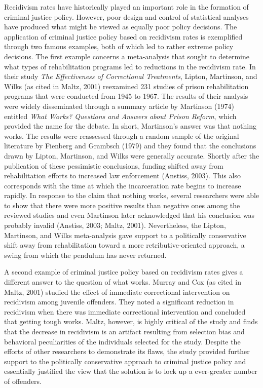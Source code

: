 Recidivism rates have historically played an important role in the formation of criminal justice policy.  However, poor design and control of statistical analyses have produced what might be viewed as equally poor policy decisions.  The application of criminal justice policy based on recidivism rates is exemplified through two famous examples, both of which led to rather extreme policy decisions.  The first example concerns a meta-analysis that sought to determine what types of rehabilitation programs led to reductions in the recidivism rate.  In their study \emph{The Effectiveness of Correctional Treatments}, Lipton, Martinson, and Wilks (as cited in Maltz, 2001) reexamined 231 studies of prison rehabilitation programs that were conducted from 1945 to 1967.  The results of their analysis were widely disseminated through a summary article by Martinson (1974) entitled \emph{What Works? Questions and Answers about Prison Reform}, which provided the name for the debate.  In short, Martinson's answer was that nothing works.  The results were reassessed through a random sample of the original literature by Fienberg and Grambsch (1979) and they found that the conclusions drawn by Lipton, Martinson, and Wilks were generally accurate.  Shortly after the publication of these pessimistic conclusions, funding shifted away from rehabilitation efforts to increased law enforcement (Anstiss, 2003).  This also corresponds with the time at which the incarceration rate begins to increase rapidly. In response to the claim that nothing works, several researchers were able to show that there were more positive results than negative ones among the reviewed studies and even Martinson later acknowledged that his conclusion was probably invalid (Anstiss, 2003; Maltz, 2001).  Nevertheless, the Lipton, Martinson, and Wilks meta-analysis gave support to a politically conservative shift away from rehabilitation toward a more retributive-oriented approach, a swing from which the pendulum has never returned.

A second example of criminal justice policy based on recidivism rates gives a different answer to the question of what works.  Murray and Cox (as cited in Maltz, 2001) studied the effect of immediate correctional intervention on recidivism among juvenile offenders.  They noted a significant reduction in recidivism when there was immediate correctional intervention and concluded that getting tough works.  Maltz, however, is highly critical of the study and finds that the decrease in recidivism is an artifact resulting from selection bias and behavioral peculiarities of the individuals selected for the study.  Despite the efforts of other researchers to demonstrate its flaws, the study provided further support to the politically conservative approach to criminal justice policy and essentially justified the view that the solution is to lock up a ever-greater number of offenders.

